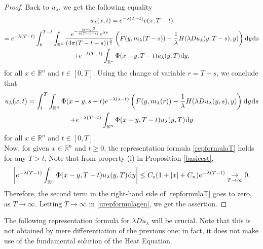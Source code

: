 \documentclass{amsart}
\theoremstyle{remark}
\theoremstyle{definition}
\theoremstyle{Claim}
\newcommand{\dd}{\hspace{0.7pt}{\rm d}}
\theoremstyle{plain}
\begin{document}
\begin{proof}
		Back to $u_\lambda$, we get the following equality
		\begin{multline*}
			u_\lambda(x,t)=e^{-\lambda(T-t)}v(x,T-t)\\
			=e^{-\lambda(T-t)}\int_{0}^{T-t}\int_{\mathbb{R}^n}\frac{e^{-\frac{\lvert x-y\rvert^2}{4(T-t-s)}}e^{\lambda s}}{(4\pi (T-t-s))^{\frac{n}{2}}} \left(F(y,m_\lambda(T-s))-\frac{1}{\lambda}H(\lambda Du_\lambda(y,T-s),y)\right)\dd y\dd s\\
			+e^{-\lambda(T-t)}\int_{\mathbb{R}^n}\Phi(x-y,T-t)u_\lambda(y,T)\dd y,
		\end{multline*}
		for all $x\in \mathbb{R}^n$ and $t\in [0,T]$. Using the change of variable $r=T-s$, we conclude that 
		\begin{multline}\label{repformulaT}
			u_\lambda(x,t)=\int_{t}^{T}\int_{\mathbb{R}^n} \Phi(x-y,s-t) e^{-\lambda (s-t)}\left(F(y,m_\lambda(r))-\frac{1}{\lambda}H(\lambda Du_\lambda(y,s),y)\right)\dd y \dd s\\
			+e^{-\lambda(T-t)}\int_{\mathbb{R}^n}\Phi(x-y,T-t)u_\lambda(y,T)\dd y
		\end{multline}
		for all $x\in \mathbb{R}^n$ and $t\in [0,T]$. 
		\\Now, for given $x\in \mathbb{R}^n$ and $t\geq 0$, the representation formula \eqref{repformulaT} holds for any $T>t$. Note that from property (i) in Proposition \ref{basicest}, 
		$$\left |e^{-\lambda(T-t)}\int_{\mathbb{R}^n}\Phi(x-y,T-t)u_\lambda(y,T)\dd y\right|\leq C_o(1+\lvert x\rvert+C_n )e^{-\lambda(T-t)}\underset{T\to \infty}{\to}0.$$
		Therefore, the second term in the right-hand side of \eqref{repformulaT} goes to zero, as $T\to \infty$. Letting $T\to \infty$ in \eqref{urepformulagen}, we get the assertion.
	\end{proof}
		
	The following representation formula for {$\lambda Du_\lambda$} will be crucial. Note that this is not obtained by mere differentiation of the previous one; in fact, it does not make use of the fundamental solution of the Heat Equation.
	
\end{document}
